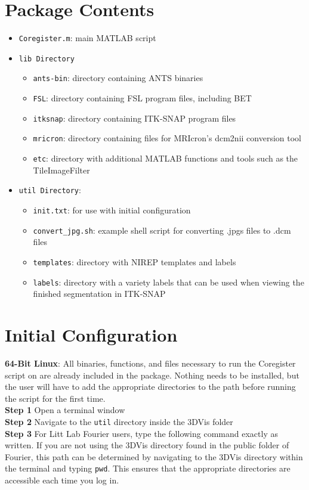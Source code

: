 \documentclass[12pt]{article}
\begin{document}
\section{Package Contents}
\begin{itemize}
\renewcommand{\labelitemii}{$\circ$}
\item \texttt{Coregister.m}: main MATLAB script 
\item \texttt{lib Directory}
	\begin{itemize}
	\item{\texttt{ants-bin}: directory containing ANTS binaries}
	\item{\texttt{FSL}: directory containing FSL program files, including BET}
	\item{\texttt{itksnap}: directory containing ITK-SNAP program files}
	\item{\texttt{mricron}: directory containing files for MRIcron's dcm2nii conversion tool}
	\item{\texttt{etc}}: directory with additional MATLAB functions and tools such as the TileImageFilter
	\end{itemize}
\item \texttt{util Directory}: 
	\begin{itemize}
	\item \texttt{init.txt}: for use with initial configuration
	\item \texttt{convert\_jpg.sh}: example shell script for converting .jpgs files to .dcm files
	\item \texttt{templates}: directory with NIREP templates and labels
	\item \texttt{labels}: directory with a variety labels that can be used when viewing the finished segmentation in ITK-SNAP
	\end{itemize}

\end{itemize}


\section{Initial Configuration}
\label{sec: initial config}
\textbf{64-Bit Linux}: All binaries, functions, and files necessary to run the Coregister script on are already included in the package. Nothing needs to be installed, but the user will have to add the appropriate directories to the path before running the script for the first time. \\
\textbf{Step 1} Open a terminal window\\
\textbf{Step 2} Navigate to the \texttt{util} directory inside the 3DVis folder\\
\textbf{Step 3} For Litt Lab Fourier users, type the following command exactly as written. If you are not using the 3DVis directory found in the public folder of Fourier, this path can be determined by navigating to the 3DVis directory within the terminal and typing \texttt{pwd}. This ensures that the appropriate directories are accessible each time you log in.
\end{document}
